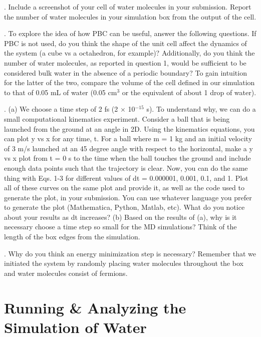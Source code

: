 \documentclass{article}
\begin{document}
\vspace*{0.3cm}
. Include a screenshot of your cell of water molecules in your submission. Report the number of water molecules in your simulation box from the output of the cell.

\vspace*{1cm}
. To explore the idea of how PBC can be useful, answer the following questions. If PBC is not used, do you think the shape of the unit cell affect the dynamics of the system (a cube vs a octahedron, for example)? Additionally, do you think the number of water molecules, as reported in question 1, would be sufficient to be considered bulk water in the absence of a periodic boundary? To gain intuition for the latter of the two, compare the volume of the cell defined in our simulation to that of 0.05 mL of water (0.05 cm$^3$ or the equivalent of about 1 drop of water). 

\vspace*{1cm}
. (a) We choose a time step of 2 fs (2 $\times$ 10$^{-15}$ s). To understand why, we can do a small computational kinematics experiment. Consider a ball that is being launched from the ground at an angle in 2D. Using the kinematics equations, you can plot y vs x for any time, t. For a ball where m = 1 kg and an initial velocity of 3 m/s launched at an 45 degree angle with respect to the horizontal, make a y vs x plot from t = 0 s to the time when the ball touches the ground and include enough data points such that the trajectory is clear. Now, you can do the same thing with Eqs. 1-3 for different values of dt = 0.000001, 0.001, 0.1, and 1. Plot all of these curves on the same plot and provide it, as well as the code used to generate the plot, in your submission. You can use whatever language you prefer to generate the plot (Mathematica, Python, Matlab, etc). What do you notice about your results as dt increases? (b) Based on the results of (a), why is it necessary choose a time step so small for the MD simulations? Think of the length of the box edges from the simulation.

\vspace*{1cm}
. Why do you think an energy minimization step is necessary? Remember that we initiated the system by randomly placing water molecules throughout the box and water molecules consist of fermions.

\section{Running \& Analyzing the Simulation of Water}
\end{document}
